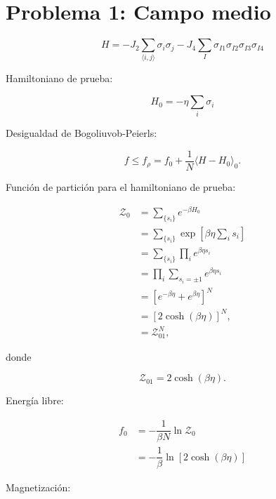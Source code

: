 \documentclass[10pt]{article}
\begin{document}
\section*{Problema 1: Campo medio}

\begin{equation}
H = -J_2 \sum_{\langle i,j\rangle} \sigma_i \sigma_j - J_4 \sum_I \sigma_{I1}\sigma_{I2}\sigma_{I3}\sigma_{I4}
\end{equation}

Hamiltoniano de prueba:

\begin{equation}
H_0 = -\eta \sum_i \sigma_i
\end{equation}

Desigualdad de Bogoliuvob-Peierls:

\begin{equation}
f \leq f_{\rho} = f_0 + \dfrac{1}{N} \langle H - H_0 \rangle_0.
\end{equation}

Funci\'on de partici\'on para el hamiltoniano de prueba:

\begin{align}
\mathcal{Z}_0 &= \sum_{\lbrace s_i\rbrace} e^{-\beta H_0} \nonumber \\
&= \sum_{\lbrace s_i\rbrace} \exp \left[ \beta \eta \sum_i s_i  \right] \nonumber \\
&= \sum_{\lbrace s_i\rbrace} \prod_i  e^{\beta \eta s_i} \nonumber \\
&= \prod_i \sum_{s_i=\pm1} e^{\beta \eta s_i}  \nonumber \\
&= \left[ e^{-\beta \eta} + e^{\beta \eta} \right]^N \nonumber \\
&= \left[ 2 \cosh\left(\beta \eta\right) \right]^N, \nonumber \\
&= \mathcal{Z}_{01}^N,
\end{align}

donde 

\begin{equation}
\mathcal{Z}_{01} = 2 \cosh\left(\beta \eta\right).
\end{equation}

Energ\'ia libre:

\begin{align}
f_0 &= -\dfrac{1}{\beta N} \ln \mathcal{Z}_0 \nonumber \\
&= -\dfrac{1}{\beta} \ln \left[ 2 \cosh\left(\beta \eta\right) \right]
\end{align}

Magnetizaci\'on:
\end{document}
